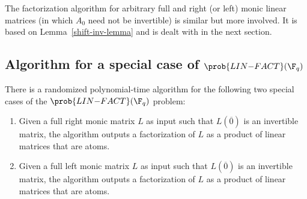 \begin{remark}
The factorization algorithm for arbitrary full and right (or left)
monic linear matrices (in which $A_0$ need not be invertible) is
similar but more involved. It is based on Lemma~\ref{shift-inv-lemma}
and is dealt with in the next section.
\end{remark}

\subsection{Algorithm for a special case of $\prob{LIN{-}FACT}(\F_q)$}

%
%
%
%
%

\begin{theorem}\label{lfact1}
  There is a randomized polynomial-time algorithm for the following
  two special cases of the $\prob{LIN{-}FACT}(\F_q)$ problem:
  \begin{enumerate}
 \item Given a full right monic matrix $L$ as input such that
   $L(\overline{0})$ is an invertible matrix, the algorithm outputs a
   factorization of $L$ as a product of linear matrices that are
   atoms.
  \item Given a full left monic matrix $L$ as input such that
   $L(\overline{0})$ is an invertible matrix, the algorithm outputs a
   factorization of $L$ as a product of linear matrices that are
   atoms.  
\end{enumerate}
\end{theorem}  

